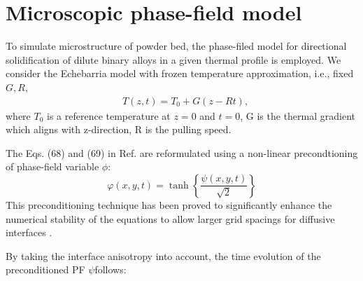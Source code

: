 \documentclass[a4paper,12pt]{article}
\begin{document}
\section{Microscopic phase-field model}
To simulate microstructure of powder bed, the phase-filed model for directional solidification of dilute binary alloys in a given thermal profile is employed. 
We consider the Echebarria model \cite{Echebarria2004} with frozen temperature approximation, i.e., fixed $G,R$,
\begin{align}
    & T(z,t) = T_0 + G(z-Rt),
\end{align}
where $T_0$ is a reference temperature at $z=0$ and $t=0$, G is the thermal gradient which aligns with z-direction, R is the pulling speed. 

The Eqs. (68) and (69) in Ref. \cite{Echebarria2004} are reformulated using a non-linear precondtioning of phase-field variable $\phi$\cite{Tourret2015}:
\begin{equation}
\varphi(x, y, t)=\tanh \left\{\frac{\psi(x, y, t)}{\sqrt{2}}\right\}
\end{equation}
 This preconditioning technique has been proved to significantly enhance the numerical stability of the equations to allow larger grid spacings for diffusive interfaces \cite{Glasner2001}.
 
By taking the interface anisotropy into account, the time evolution of the preconditioned PF $\psi$follows:
\end{document}
